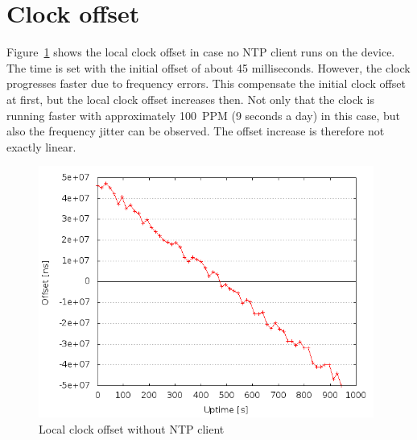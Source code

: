 \section{Clock offset}
Figure~\ref{fig:measurements-no-ntp} shows the local clock offset
in case no NTP client runs on the device.
The time is set with the initial offset of about 45 milliseconds.
However, the clock progresses faster due to frequency errors.
This compensate the initial clock offset at first,
but the local clock offset increases then.
Not only that the clock is running faster with approximately 100~PPM
(9 seconds a day) in this case,
but also the frequency jitter can be observed.
The offset increase is therefore not exactly linear.
\begin{figure}[H]
  \centering
  \includegraphics[width=11cm,keepaspectratio]{fig/no-ntp.png}
  \caption{Local clock offset without NTP client}
  \label{fig:measurements-no-ntp}
\end{figure}


